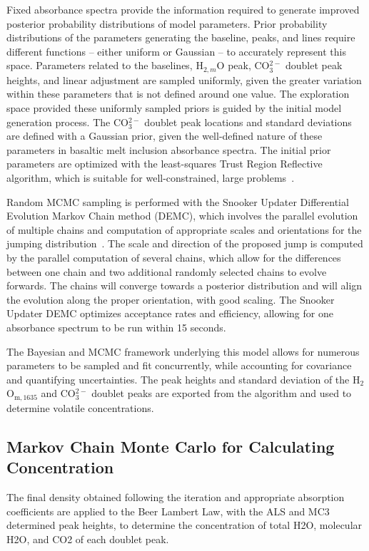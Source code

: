 \documentclass[draft]{agujournal2019}
\begin{document}
Fixed absorbance spectra provide the information required to generate improved posterior probability distributions of model parameters. Prior probability distributions of the parameters generating the baseline, peaks, and lines require different functions – either uniform or Gaussian – to accurately represent this space. Parameters related to the baselines, H$_{2, m}$O peak, CO$_{3}^{2-}$ doublet peak heights, and linear adjustment are sampled uniformly, given the greater variation within these parameters that is not defined around one value. The exploration space provided these uniformly sampled priors is guided by the initial model generation process. The CO$_{3}^{2-}$ doublet peak locations and standard deviations are defined with a Gaussian prior, given the well-defined nature of these parameters in basaltic melt inclusion absorbance spectra. The initial prior parameters are optimized with the least-squares Trust Region Reflective algorithm, which is suitable for well-constrained, large problems~\cite{Branchetal1999}. 

Random MCMC sampling is performed with the Snooker Updater Differential Evolution Markov Chain method (DEMC), which involves the parallel evolution of multiple chains and computation of appropriate scales and orientations for the jumping distribution~\cite{terBraak2006, terBraakandVrugt2008}. The scale and direction of the proposed jump is computed by the parallel computation of several chains, which allow for the differences between one chain and two additional randomly selected chains to evolve forwards. The chains will converge towards a posterior distribution and will align the evolution along the proper orientation, with good scaling. The Snooker Updater DEMC optimizes acceptance rates and efficiency, allowing for one absorbance spectrum to be run within 15 seconds. 

The Bayesian and MCMC framework underlying this model allows for numerous parameters to be sampled and fit concurrently, while accounting for covariance and quantifying uncertainties. The peak heights and standard deviation of the H$_{2}$O$_{\mathrm{m}, 1635}$ and CO$_{3}^{2-}$ doublet peaks are exported from the algorithm and used to determine volatile concentrations. 

\subsection{Markov Chain Monte Carlo for Calculating Concentration}


The final density obtained following the iteration and appropriate absorption coefficients are applied to the Beer Lambert Law, with the ALS and MC3 determined peak heights, to determine the concentration of total H2O, molecular H2O, and CO2 of each doublet peak. 
\end{document}
